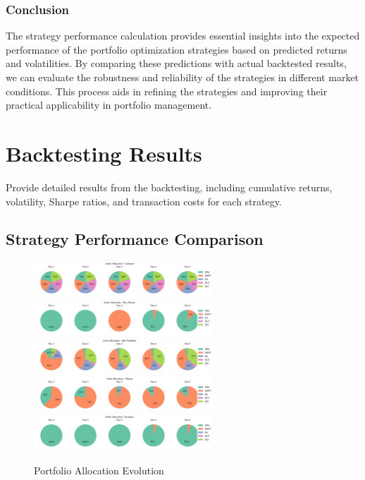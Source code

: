 \subsubsection{Conclusion}

The strategy performance calculation provides essential insights into the expected performance of the portfolio optimization strategies based on predicted returns and volatilities. By comparing these predictions with actual backtested results, we can evaluate the robustness and reliability of the strategies in different market conditions. This process aids in refining the strategies and improving their practical applicability in portfolio management.



\section{Backtesting Results}
Provide detailed results from the backtesting, including cumulative returns, volatility, Sharpe ratios, and transaction costs for each strategy.

\subsection{Strategy Performance Comparison}

\begin{figure}[htbp]
    \centering
    \includegraphics[width=0.6\textwidth]{figures/asset_allocations_constant.png}
    \includegraphics[width=0.6\textwidth]{figures/asset_allocations_max_return.png}
    \includegraphics[width=0.6\textwidth]{figures/asset_allocations_min_volatility.png}
    \includegraphics[width=0.6\textwidth]{figures/asset_allocations_sharpe.png}
    \includegraphics[width=0.6\textwidth]{figures/asset_allocations_dynamic.png}
    \caption{Portfolio Allocation Evolution}
    \label{fig:asset_allocations_evolution}
\end{figure}

